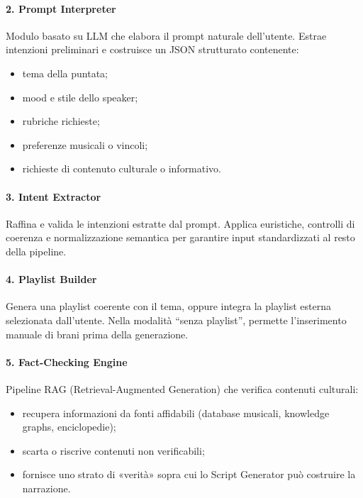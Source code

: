 \documentclass[11pt,a4paper]{article}
\begin{document}
\paragraph{2. Prompt Interpreter}
Modulo basato su LLM che elabora il prompt naturale dell’utente.  
Estrae intenzioni preliminari e costruisce un JSON strutturato contenente:
\begin{itemize}
    \item tema della puntata;
    \item mood e stile dello speaker;
    \item rubriche richieste;
    \item preferenze musicali o vincoli;
    \item richieste di contenuto culturale o informativo.
\end{itemize}

\paragraph{3. Intent Extractor}
Raffina e valida le intenzioni estratte dal prompt.  
Applica euristiche, controlli di coerenza e normalizzazione semantica per garantire input standardizzati al resto della pipeline.

\paragraph{4. Playlist Builder}
Genera una playlist coerente con il tema, oppure integra la playlist esterna selezionata dall’utente.  
Nella modalità “senza playlist”, permette l’inserimento manuale di brani prima della generazione.

\paragraph{5. Fact-Checking Engine}
Pipeline RAG (Retrieval-Augmented Generation) che verifica contenuti culturali:  
\begin{itemize}
    \item recupera informazioni da fonti affidabili (database musicali, knowledge graphs, enciclopedie);
    \item scarta o riscrive contenuti non verificabili;
    \item fornisce uno strato di «verità» sopra cui lo Script Generator può costruire la narrazione.
\end{itemize}
\end{document}
